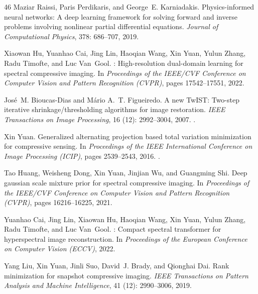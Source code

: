 \documentclass[11pt]{article}
\begin{document}
\begin{thebibliography}{46}
Maziar Raissi, Paris Perdikaris, and George~E. Karniadakis.
\newblock Physics-informed neural networks: A deep learning framework for
  solving forward and inverse problems involving nonlinear partial differential
  equations.
\newblock \emph{Journal of Computational Physics}, 378: 686--707,
  2019.

Xiaowan Hu, Yuanhao Cai, Jing Lin, Haoqian Wang, Xin Yuan, Yulun Zhang, Radu
  Timofte, and Luc Van~Gool.
: High-resolution dual-domain learning for spectral
  compressive imaging.
\newblock In \emph{Proceedings of the IEEE/CVF Conference on Computer Vision
  and Pattern Recognition (CVPR)}, pages 17542--17551, 2022.

Jos{\'e}~M. Bioucas-Dias and M{\'a}rio A.~T. Figueiredo.
\newblock A new {TwIST}: Two-step iterative shrinkage/thresholding algorithms
  for image restoration.
\newblock \emph{IEEE Transactions on Image Processing}, 16
  (12): 2992--3004, 2007.
\newblock {}.

Xin Yuan.
\newblock Generalized alternating projection based total variation minimization
  for compressive sensing.
\newblock In \emph{Proceedings of the IEEE International Conference on Image
  Processing (ICIP)}, pages 2539--2543, 2016.
\newblock {}.

Tao Huang, Weisheng Dong, Xin Yuan, Jinjian Wu, and Guangming Shi.
\newblock Deep gaussian scale mixture prior for spectral compressive imaging.
\newblock In \emph{Proceedings of the IEEE/CVF Conference on Computer Vision
  and Pattern Recognition (CVPR)}, pages 16216--16225, 2021.

Yuanhao Cai, Jing Lin, Xiaowan Hu, Haoqian Wang, Xin Yuan, Yulun Zhang, Radu
  Timofte, and Luc Van~Gool.
: Compact spectral transformer for hyperspectral image
  reconstruction.
\newblock In \emph{Proceedings of the European Conference on Computer Vision
  (ECCV)}, 2022{}.

Yang Liu, Xin Yuan, Jinli Suo, David~J. Brady, and Qionghai Dai.
\newblock Rank minimization for snapshot compressive imaging.
\newblock \emph{IEEE Transactions on Pattern Analysis and Machine
  Intelligence}, 41 (12): 2990--3006, 2019.


\end{thebibliography}
\end{document}
